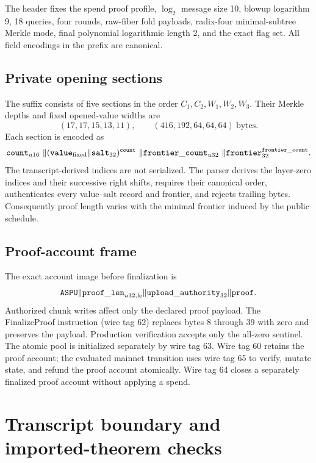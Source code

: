 The header fixes the spend proof profile, \(\log_2\) message size 10, blowup logarithm 9,
18 queries, four rounds, raw-fiber fold payloads, radix-four minimal-subtree
Merkle mode, final polynomial logarithmic length 2, and the exact flag set.
All field encodings in the prefix are canonical.

\subsection{Private opening sections}

The suffix consists of five sections in the order \(C_1,C_2,W_1,W_2,W_3\).
Their Merkle depths and fixed opened-value widths are
\[
 (17,17,15,13,11),\qquad
 (416,192,64,64,64)\ \text{bytes}.
\]
Each section is encoded as
\[
 \mathtt{count}_{u16}\ \|
 (\mathtt{value}_{\rm fixed}\|\mathtt{salt}_{32})^{\mathtt{count}}\ \|
 \mathtt{frontier\_count}_{u32}\ \|
 \mathtt{frontier}_{32}^{\mathtt{frontier\_count}}.
\]
The transcript-derived indices are not serialized.  The parser derives the
layer-zero indices and their successive right shifts, requires their
canonical order, authenticates every value--salt record and frontier, and
rejects trailing bytes.  Consequently proof length varies with the minimal
frontier induced by the public schedule.

\subsection{Proof-account frame}

The exact account image before finalization is
\[
 \mathtt{ASPU}\|\mathtt{proof\_len}_{u32,\rm le}
 \|\mathtt{upload\_authority}_{32}\|\mathtt{proof}.
\]
Authorized chunk writes affect only the declared proof payload.  The
\textsf{FinalizeProof} instruction (wire tag 62) replaces bytes 8 through 39
with zero and preserves the payload.  Production verification accepts only
the all-zero sentinel.  The atomic pool is initialized separately by wire tag
63.  Wire tag 60 retains the proof account; the evaluated mainnet transition
uses wire tag 65 to verify, mutate state, and refund the proof account
atomically.  Wire tag 64 closes a separately finalized proof account without
applying a spend.

\section{Transcript boundary and imported-theorem checks}
\label{app:transcript-hypotheses}

